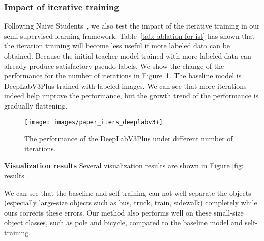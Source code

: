 \documentclass[10pt,twocolumn,letterpaper]{article}
\begin{document}
{\subsubsection{Impact of 
iterative 
training
}
Following Naive Students~\cite{chen2005naive}, we also test the impact of the 
iterative 
training in our semi-supervised learning framework. Table~\ref{tab: ablation for ist} has shown that the iteration training will become less useful if more labeled data can be obtained. Because the initial teacher model trained with more labeled data can already produce satisfactory pseudo labels. We show the change of the performance for the number of iterations in Figure~\ref{fig: iter_dp3}. The baseline model is DeepLabV3Plus trained with  labeled images. We can see that more iterations 
indeed 
help improve the performance, but the growth trend of the performance is gradually flattening.




\begin{figure}
  \centering
    \texttt{[image: images/paper\_iters\_deeplabv3+]}
 
    
\caption{The performance of the DeepLabV3Plus under different number of iterations.} 
\label{fig: iter_dp3}
 	\vspace{-0.2cm}
\end{figure}





{\bf Visualization results}
Several visualization results are shown in Figure \ref{fig: results}. 
\iffalse
The baseline method is trained with 
  of all 
labeled images. 
The ST represents the self-training trained with 

pseudo labels without our methods. 
 `ours'  donates our framework.
\fi  
We can see  that the baseline and self-training can not well separate the objects (especially large-size 
objects such as  bus, truck, train, sidewalk) completely while ours corrects these errors. Our method also performs well on these small-size object classes, such as pole and bicycle, compared to the baseline model and self-training. 



}
\end{document}
